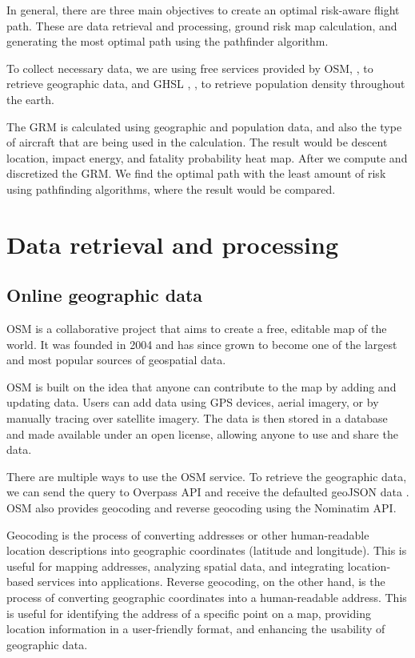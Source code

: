 \documentclass[12pt]{report}
\begin{document}
        In general, there are three main objectives to create an optimal risk-aware flight path. These are data
        retrieval and processing, ground risk map calculation, and generating the most optimal path using the pathfinder
        algorithm.

        To collect necessary data, we are using free services provided by \ac{OSM},
        \cite{openstreetmap_contributors_planet_2017}, to retrieve geographic data, and \ac{GHSL} ,
        \cite{commission_ghsl_2023}, to retrieve population density throughout the earth.

        The \ac{GRM} is calculated using geographic and population data, and also the type of aircraft that are being
        used in the calculation. The result would be descent location, impact energy, and fatality probability heat map.
        After we compute and discretized the GRM. We find the optimal path with the least amount of risk using
        pathfinding algorithms, where the result would be compared.

    \section{Data retrieval and processing}
        \subsection{Online geographic data}
        OSM is a collaborative project that aims to create a free, editable map of the world. It was founded in 2004 and
        has since grown to become one of the largest and most popular sources of geospatial data.
            
        OSM is built on the idea that anyone can contribute to the map by adding and updating data. Users can add data
        using \ac{GPS} devices, aerial imagery, or by manually tracing over satellite imagery. The data is then stored
        in a database and made available under an open license, allowing anyone to use and share the data.
            
        There are multiple ways to use the OSM service. To retrieve the geographic data, we can send the query to
        Overpass \ac{API} and receive the defaulted \ac{geoJSON} data \cite{openstreet_overpass_2022}. OSM also provides
        geocoding and reverse geocoding using the Nominatim API.
            
        Geocoding is the process of converting addresses or other human-readable location descriptions into geographic
        coordinates (latitude and longitude). This is useful for mapping addresses, analyzing spatial data, and
        integrating location-based services into applications. Reverse geocoding, on the other hand, is the process of
        converting geographic coordinates into a human-readable address. This is useful for identifying the address of a
        specific point on a map, providing location information in a user-friendly format, and enhancing the usability
        of geographic data.
\end{document}
